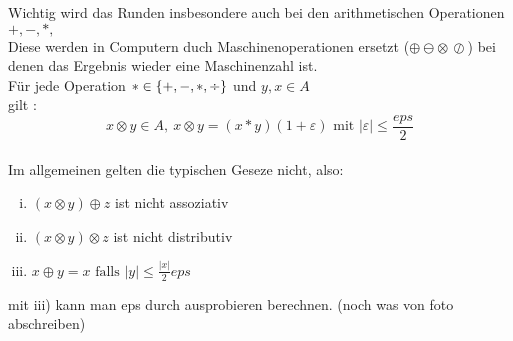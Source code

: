 \documentclass[../Skript.tex]{subfiles}
\begin{document}
Wichtig wird das Runden insbesondere auch bei den arithmetischen Operationen $+,-,*,$ \textdiv
\\Diese werden in Computern duch Maschinenoperationen ersetzt 
($\oplus \ominus \otimes\, \oslash$) bei denen das Ergebnis wieder eine Maschinenzahl ist.\\
Für jede Operation $\ast\in \{+,-,*,\text{\textdiv}\}$ und $y,x \in A$ \\gilt :$$x \otimes y\in A,\ x \otimes y =(x*y)(1+\varepsilon) \text{ mit } |\varepsilon|\leq \frac{eps}{2}$$\\
Im allgemeinen gelten die typischen Geseze nicht, also:\\
\begin{enumerate}[i)]
    \item $(x \otimes y) \oplus z$ ist nicht assoziativ
    \item $(x \otimes y) \otimes z$ ist nicht distributiv
    \item $x \oplus y =x \text{ falls } |y|\leq \displaystyle\frac{|x|}{2}eps$
\end{enumerate}
mit iii) kann man eps durch ausprobieren berechnen.
(noch was von foto abschreiben)
\end{document}
